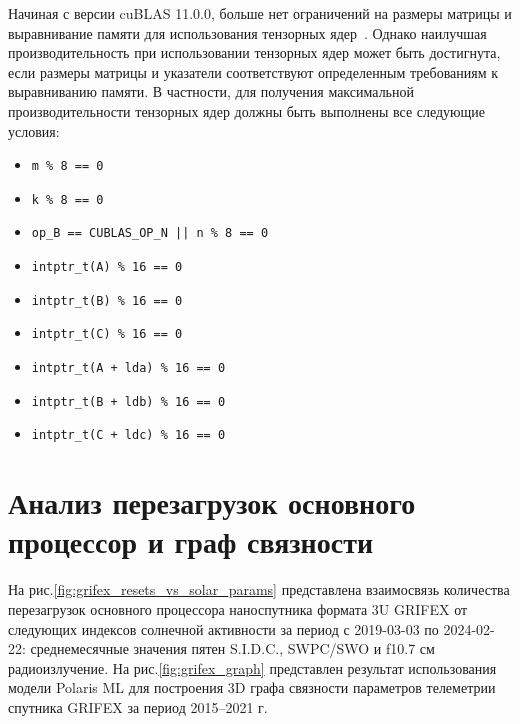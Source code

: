 \documentclass[14pt, a4paper]{extreport}
\begin{document}
    Начиная с версии cuBLAS 11.0.0, больше нет ограничений на размеры матрицы и выравнивание памяти для использования тензорных ядер~\cite{nvidia_cublas_docs}.
    Однако наилучшая производительность при использовании тензорных ядер может быть достигнута, если размеры матрицы и указатели соответствуют определенным требованиям к выравниванию памяти.
    В частности, для получения максимальной производительности тензорных ядер должны быть выполнены все следующие условия:

    \begin{itemize}
        \item \texttt{m \% 8 == 0}
        \item \texttt{k \% 8 == 0}
        \item \texttt{op\_B == CUBLAS\_OP\_N || n \% 8 == 0}
        \item \texttt{intptr\_t(A) \% 16 == 0}
        \item \texttt{intptr\_t(B) \% 16 == 0}
        \item \texttt{intptr\_t(C) \% 16 == 0}
        \item \texttt{intptr\_t(A + lda) \% 16 == 0}
        \item \texttt{intptr\_t(B + ldb) \% 16 == 0}
        \item \texttt{intptr\_t(C + ldc) \% 16 == 0}
    \end{itemize}

    \section{Анализ перезагрузок основного процессор и граф связности}

    На рис.\ref{fig:grifex_resets_vs_solar_params} представлена взаимосвязь количества перезагрузок основного процессора наноспутника формата 3U GRIFEX от следующих индексов солнечной активности за период с 2019-03-03 по 2024-02-22: среднемесячные значения пятен S.I.D.C., SWPC/SWO и f10.7 см радиоизлучение.
    На рис.\ref{fig:grifex_graph} представлен результат использования модели Polaris ML для построения 3D графа связности параметров телеметрии спутника GRIFEX за период 2015–2021 г.
\end{document}
